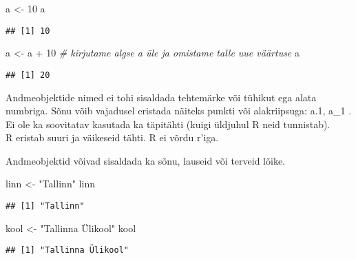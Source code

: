 \documentclass[
]{book}
\newenvironment{Shaded}{\begin{snugshade}}{\end{snugshade}}
\newcommand{\CommentTok}[1]{\textcolor[rgb]{0.56,0.35,0.01}{\textit{#1}}}
\newcommand{\DecValTok}[1]{\textcolor[rgb]{0.00,0.00,0.81}{#1}}
\newcommand{\NormalTok}[1]{#1}
\newcommand{\OtherTok}[1]{\textcolor[rgb]{0.56,0.35,0.01}{#1}}
\newcommand{\SpecialCharTok}[1]{\textcolor[rgb]{0.00,0.00,0.00}{#1}}
\newcommand{\StringTok}[1]{\textcolor[rgb]{0.31,0.60,0.02}{#1}}
\begin{document}
\begin{Shaded}
\begin{Highlighting}[]
\NormalTok{a }\OtherTok{\textless{}{-}} \DecValTok{10}
\NormalTok{a}
\end{Highlighting}
\end{Shaded}

\begin{verbatim}
## [1] 10
\end{verbatim}

\begin{Shaded}
\begin{Highlighting}[]
\NormalTok{a }\OtherTok{\textless{}{-}}\NormalTok{ a }\SpecialCharTok{+} \DecValTok{10} \CommentTok{\# kirjutame algse a üle ja omistame talle uue väärtuse}
\NormalTok{a}
\end{Highlighting}
\end{Shaded}

\begin{verbatim}
## [1] 20
\end{verbatim}

Andmeobjektide nimed ei tohi sisaldada tehtemärke või tühikut ega alata numbriga. Sõnu võib vajadusel eristada näiteks punkti või alakriipsuga: a.1, a\_1 . Ei ole ka soovitatav kasutada ka täpitähti (kuigi üldjuhul R neid tunnistab).\\
R eristab suuri ja väikeseid tähti. R ei võrdu r'iga.

Andmeobjektid võivad sisaldada ka sõnu, lauseid või terveid lõike.

\begin{Shaded}
\begin{Highlighting}[]
\NormalTok{linn }\OtherTok{\textless{}{-}} \StringTok{"Tallinn"}
\NormalTok{linn}
\end{Highlighting}
\end{Shaded}

\begin{verbatim}
## [1] "Tallinn"
\end{verbatim}

\begin{Shaded}
\begin{Highlighting}[]
\NormalTok{kool }\OtherTok{\textless{}{-}} \StringTok{"Tallinna Ülikool"}
\NormalTok{kool}
\end{Highlighting}
\end{Shaded}

\begin{verbatim}
## [1] "Tallinna Ülikool"
\end{verbatim}
\end{document}
